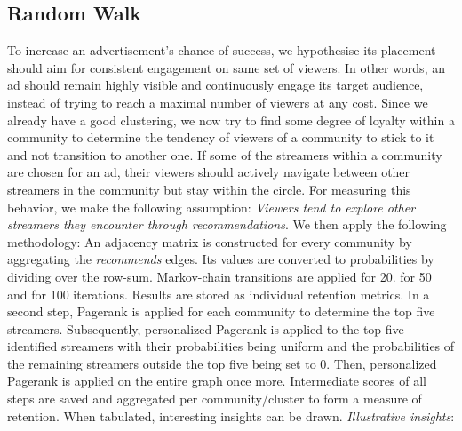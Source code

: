 \documentclass[11pt, oneside]{article}   	%
\begin{document}
\subsection{Random Walk}
To increase an advertisement's chance of success, we hypothesise its placement should aim for consistent engagement on same set of viewers. In other words, an ad should remain highly visible and continuously engage its target audience, instead of trying to reach a maximal number of viewers at any cost.
Since we already have a good clustering, we now try to find some degree of loyalty within a community to determine the tendency of viewers of a community to stick to it and not transition to another one.
If some of the streamers within a community are chosen for an ad, their viewers should actively navigate between other streamers in the community but stay within the circle. For measuring this behavior, we make the following assumption: \textit{Viewers tend to explore other streamers they encounter through recommendations}.
\newline
\newline
We then apply the following methodology:
An adjacency matrix is constructed for every community by aggregating the \textit{recommends} edges. Its values are converted to probabilities by dividing over the row-sum. Markov-chain transitions are applied for 20. for 50 and for 100 iterations. Results are stored as individual retention metrics.
\newline
In a second step, Pagerank is applied for each community to determine the top five streamers. Subsequently, personalized Pagerank is applied to the top five identified streamers with their probabilities being uniform and the probabilities of the remaining streamers outside the top five being set to 0.
Then, personalized Pagerank is applied on the entire graph once more. Intermediate scores of all steps are saved and aggregated per community/cluster to form a measure of retention. When tabulated, interesting insights can be drawn.
\newline
\newline
\textit{Illustrative insights}:
\end{document}
